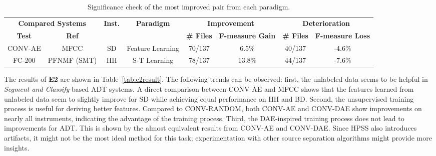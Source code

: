 \documentclass{article}
\newcommand{\comment}[1]{{\textcolor{blue}{#1}}}
\begin{document}
\begin{table}[t]
\centering
\begin{tabularx}{\textwidth}{cccccccc}
\hline
\multicolumn{2}{c}{\textbf{Compared Systems}} & \multirow{2}{*}{\textbf{Inst.}} & \multirow{2}{*}{\textbf{Paradigm}} & \multicolumn{2}{c}{\textbf{Improvement}}    & \multicolumn{2}{c}{\textbf{Deterioration}}  \\ \cline{1-2} \cline{5-8} 
\textbf{Test}          & \textbf{Ref}         &                                      &                                    & \textbf{\# Files} & \textbf{F-measure Gain} & \textbf{\# Files} & \textbf{F-measure Loss} \\ \hline
CONV-AE               & MFCC                 & SD                                   & Feature Learning                   & 70/137            & 6.5\%                   & 40/137            & -4.6\%                  \\
FC-200                & PFNMF (SMT)          & HH                                   & S-T Learning                       & 78/137            & 13.8\%                  & 44/137            & -7.6\%                  \\ \hline
\end{tabularx}%
\caption{Significance check of the most improved pair from each paradigm.}
\label{tab:improvCheck}
\end{table}

The results of \textbf{E2} are shown in Table~\ref{tab:e2result}. The following trends can be observed: first, the unlabeled data seems to be helpful in \textit{Segment and Classify}-based ADT systems. A direct comparison between CONV-AE and MFCC shows that the features learned from unlabeled data seem to slightly improve for SD while achieving equal performance on HH and BD. Second, the unsupervised training process is useful for deriving better features. Compared to CONV-RANDOM, both CONV-AE and CONV-DAE show improvements on nearly all instruments, indicating the advantage of the training process. Third, the DAE-inspired training process does not lead to improvements for ADT. This is shown by the almost equivalent results from CONV-AE and CONV-DAE. Since HPSS also introduces artifacts, it might not be the most ideal method for this task;  experimentation with other source separation algorithms might provide more insights. 
\end{document}
